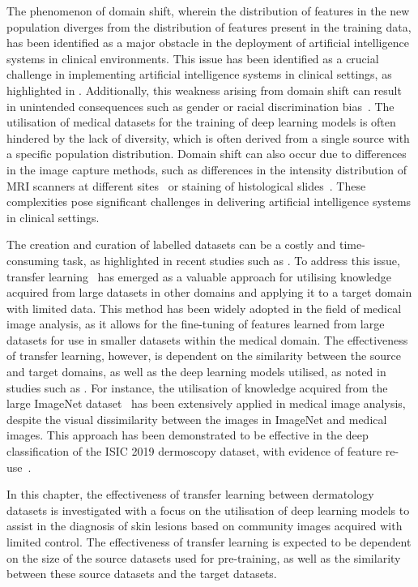 The phenomenon of domain shift, wherein the distribution of features in the new population diverges from the distribution of features present in the training data, has been identified as a major obstacle in the deployment of artificial intelligence systems in clinical environments. This issue has been identified as a crucial challenge in implementing artificial intelligence systems in clinical settings, as highlighted in \cite{kelly2019key}. Additionally, this weakness arising from domain shift can result in unintended consequences such as gender or racial discrimination bias~\citep{glocker2022risk}. The utilisation of medical datasets for the training of deep learning models is often hindered by the lack of diversity, which is often derived from a single source with a specific population distribution. Domain shift can also occur due to differences in the image capture methods, such as differences in the intensity distribution of MRI scanners at different sites~\citep{prados2017spinal} or staining of histological slides~\citep{stacke2020measuring}. These complexities pose significant challenges in delivering artificial intelligence systems in clinical settings.

The creation and curation of labelled datasets can be a costly and time-consuming task, as highlighted in recent studies such as \cite{chin2022prepare}. To address this issue, transfer learning~\citep{weiss2016survey} has emerged as a valuable approach for utilising knowledge acquired from large datasets in other domains and applying it to a target domain with limited data. This method has been widely adopted in the field of medical image analysis, as it allows for the fine-tuning of features learned from large datasets for use in smaller datasets within the medical domain. The effectiveness of transfer learning, however, is dependent on the similarity between the source and target domains, as well as the deep learning models utilised, as noted in studies such as \cite{matsoukas2022makes}. For instance, the utilisation of knowledge acquired from the large ImageNet dataset~\citep{deng2009imagenet} has been extensively applied in medical image analysis, despite the visual dissimilarity between the images in ImageNet and medical images. This approach has been demonstrated to be effective in the deep classification of the ISIC 2019 dermoscopy dataset, with evidence of feature re-use~\citep{matsoukas2022makes}.

In this chapter, the effectiveness of transfer learning between dermatology datasets is investigated with a focus on the utilisation of deep learning models to assist in the diagnosis of skin lesions based on community images acquired with limited control. The effectiveness of transfer learning is expected to be dependent on the size of the source datasets used for pre-training, as well as the similarity between these source datasets and the target datasets.

